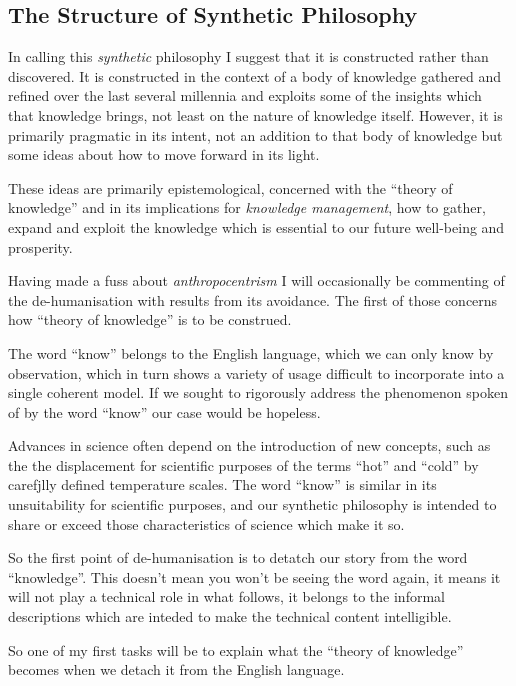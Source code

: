 \documentclass[10pt,titlepage]{book}
\begin{document}
\subsection{The Structure of Synthetic Philosophy}

In calling this \emph{synthetic} philosophy I suggest that it is constructed rather than discovered.
It is constructed in the context of a body of knowledge gathered and refined over the last several millennia and exploits some of the insights which that knowledge brings, not least on the nature of knowledge itself.
However, it is primarily pragmatic in its intent, not an addition to that body of knowledge but some ideas about how to move forward in its light.


These ideas are primarily epistemological, concerned with the ``theory of knowledge'' and in its implications for \emph{knowledge management}, how to gather, expand and exploit the knowledge which is essential to our future well-being and prosperity.

Having made a fuss about \emph{anthropocentrism} I will occasionally be commenting of the de-humanisation with results from its avoidance.
The first of those concerns how ``theory of knowledge'' is to be construed.

The word ``know'' belongs to the English language, which we can only know by observation, which in turn shows a variety of usage difficult to incorporate into a single coherent model.
If we sought to rigorously address the phenomenon spoken of by the word ``know'' our case would be hopeless.

Advances in science often depend on the introduction of new concepts, such as the the displacement for scientific purposes of the terms ``hot'' and ``cold'' by carefjlly defined temperature scales.
The word ``know'' is similar in its unsuitability for scientific purposes, and our synthetic philosophy is intended to share or exceed those characteristics of science which make it so.

So the first point of de-humanisation is to detatch our story from the word ``knowledge''.
This doesn't mean you won't be seeing the word again, it means it will not play a technical role in what follows, it belongs to the informal descriptions which are inteded to make the technical content intelligible.

So one of my first tasks will be to explain what the ``theory of knowledge'' becomes when we detach it from the English language.
\end{document}
